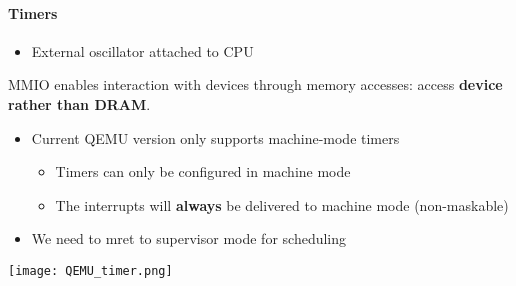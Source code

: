 \paragraph{Timers}
\begin{itemize}
    \item External oscillator attached to CPU
\end{itemize}

\newpar{}

MMIO enables interaction with devices through memory accesses: access \textbf{device rather than DRAM}.

\newpar{}

\begin{itemize}
    \item Current QEMU version only supports machine-mode timers
    \begin{itemize}
        \item Timers can only be configured in machine mode
        \item The interrupts will \textbf{always} be delivered to machine mode (non-maskable)
    \end{itemize}
    \item We need to mret to supervisor mode for scheduling
\end{itemize}
\begin{center}
    \texttt{[image: QEMU\_timer.png]}
\end{center}

